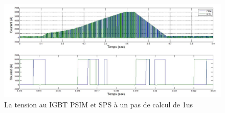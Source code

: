\documentclass[11pt,letterpaper,final]{report}
\begin{document}
\begin{figure}[h!]
\centering
\includegraphics[scale=0.5]{Fig/DCPDCN/DCPCourantIGBT1u.jpg}
\caption{La tension au IGBT PSIM et SPS à un pas de calcul de 1us}
\label{DC_IG_cou_1}
\end{figure}
\end{document}
